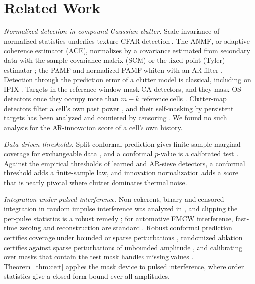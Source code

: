\documentclass[journal]{IEEEtran}
\begin{document}
\section{Related Work}\label{sec:related}
\emph{Normalized detection in compound-Gaussian clutter.} Scale invariance of normalized statistics underlies texture-CFAR detection \cite{conte1995,kraut1999,ollila2012}. The ANMF, or adaptive coherence estimator (ACE), normalizes by a covariance estimated from secondary data \cite{kelly1986glrt} with the sample covariance matrix (SCM) \cite{kraut1999} or the fixed-point (Tyler) estimator \cite{pascal2008fp}; the PAMF and normalized PAMF whiten with an AR filter \cite{roman2000,michels2000}. Detection through the prediction error of a clutter model is classical, including on IPIX \cite{haykin1995}. Targets in the reference window mask CA detectors, and they mask OS detectors once they occupy more than $m-k$ reference cells \cite{rohling1983,gandhi1988}. Clutter-map detectors filter a cell's own past power \cite{lops1989}, and their self-masking by persistent targets has been analyzed and countered by censoring \cite{naldi1999}. We found no such analysis for the AR-innovation score of a cell's own history.

\emph{Data-driven thresholds.} Split conformal prediction gives finite-sample marginal coverage for exchangeable data \cite{lei2018,vovk2012}, and a conformal $p$-value is a calibrated test \cite{bates2023}. Against the empirical thresholds of learned and AR-sieve detectors, a conformal threshold adds a finite-sample law, and innovation normalization adds a score that is nearly pivotal where clutter dominates thermal noise.

\emph{Integration under pulsed interference.} Non-coherent, binary and censored integration in random impulse interference was analyzed in \cite{himonas1994api}, and clipping the per-pulse statistics is a robust remedy \cite{abbasi2018clip}; for automotive FMCW interference, fast-time zeroing and reconstruction are standard \cite{toth2019comp,rameez2021ar}. Robust conformal prediction certifies coverage under bounded or sparse perturbations \cite{gendler2022arcp,zargarbashi2024robust}, randomized ablation certifies against sparse perturbations of unbounded amplitude \cite{levine2020ablation}, and calibrating over masks that contain the test mask handles missing values \cite{zaffran2023missing}. Theorem~\ref{thm:cert} applies the mask device to pulsed interference, where order statistics give a closed-form bound over all amplitudes.
\end{document}

